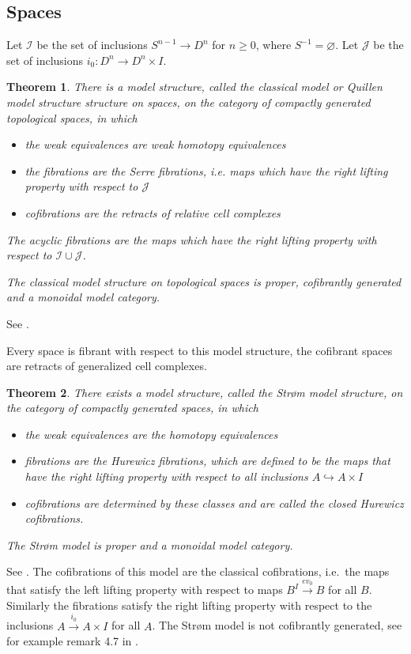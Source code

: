 \documentclass{scrartcl}
\theoremstyle{plain}
\newtheorem{theorem}{Theorem}[section]
\theoremstyle{definition}
\newcommand{\cat}[1]{\mathcal{#1}}
\renewcommand{\emptyset}{\varnothing}
\newcommand{\union}{\mathbin{\cup}}
\let\xto\xrightarrow
\newcommand{\injto}{\hookrightarrow}
\begin{document}
\subsection{Spaces}
Let $\cat I$ be the set of inclusions $S^{n-1}\to D^n$ for $n\geq 0$, where $S^{-1}=\emptyset$. Let $\cat J$ be the set of inclusions $i_0\colon D^n\to D^n\times I$.
\begin{theorem}
There is a model structure, called the classical model or Quillen model structure structure on spaces, on the category of compactly generated topological spaces, in which
\begin{itemize}
    \item the weak equivalences are weak homotopy equivalences
    \item the fibrations are the Serre fibrations, i.e. maps which have the right lifting property with respect to $\cat J$
    \item cofibrations are the retracts of relative cell complexes
\end{itemize}
The acyclic fibrations are the maps which have the right lifting property with respect to $\cat I\union\cat J$. 

The classical model structure on topological spaces is proper, cofibrantly generated and a monoidal model category. 
\end{theorem}
See \cite[17.2.2]{may2011more}.

Every space is fibrant with respect to this model structure, the cofibrant spaces are retracts of generalized cell complexes.


\begin{theorem}
    There exists a model structure, called the Strøm model structure, on the category of compactly generated spaces, in which
    \begin{itemize}
        \item the weak equivalences are the homotopy equivalences
        \item fibrations are the Hurewicz fibrations, which are defined to be the maps that have the right lifting property with respect to all inclusions $A\injto A\times I$
        \item cofibrations are determined by these classes and are called the closed Hurewicz cofibrations.
    \end{itemize} 
    The Strøm model is proper and a monoidal model category. 
\end{theorem}
See \cite[17.1.1 and 17.1.3]{may2011more}.
The cofibrations of this model are the classical cofibrations, i.e.\ the maps that satisfy the left lifting property with respect to maps $B^I\xto{ev_0} B$ for all $B$. Similarly the fibrations satisfy the right lifting property with respect to the inclusions $A\xto{i_0} A\times I$ for all $A$. The Strøm model is not cofibrantly generated, see for example remark 4.7 in \cite{raptis2010homotopy}.
\end{document}
